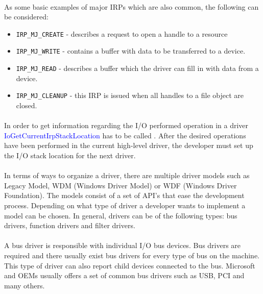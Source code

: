 		\paragraph{}
		As some basic examples of major IRPs which are also common, the following can be considered:		
		\begin{itemize}
			\item \texttt{IRP\_MJ\_CREATE} - describes a request to open a handle to a resource
			\item \texttt{IRP\_MJ\_WRITE} - contains a buffer with data to be transferred to a device.
			\item \texttt{IRP\_MJ\_READ} - describes a buffer which the driver can fill in with data from a device.
			\item \texttt{IRP\_MJ\_CLEANUP} - this IRP is issued when all handles to a file object are closed.
		\end{itemize}
	
		\paragraph{}
	   	In order to get information regarding the I/O performed operation in a  driver \textcolor{blue}{IoGetCurrentIrpStackLocation} has to be called . After the desired operations have been performed in the current high-level driver, the developer   must set up the I/O stack location for the next driver\cite{MSDNIOStackLocations}.
	   
	   	\paragraph{}
	   	In terms of ways to organize a driver, there are multiple driver models such as Legacy Model, WDM (Windows Driver Model) or WDF (Windows Driver Foundation). The models consist of a set of API's that ease the development process. Depending on what type of driver a developer wants to implement a model can be chosen. In general, drivers can be of the following types: bus drivers, function drivers and filter drivers. 
	   	
	   	\paragraph{}
	   	A bus driver is responsible with individual I/O bus devices. Bus drivers are required and there usually exist bus drivers for every type of bus on the machine. This type of driver can also report child devices connected to the bus. Microsoft and OEMs usually offers a set of common bus drivers such as USB, PCI and many others\cite{MSDNWDMDrivers}.
	   	
